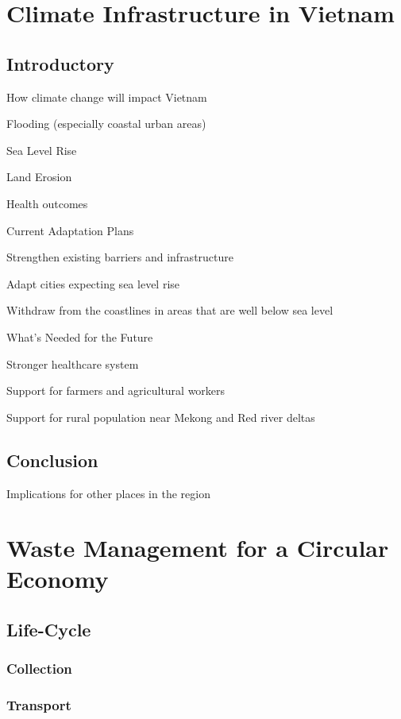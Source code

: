 \documentclass{book}\usepackage{knitr}
\begin{document}
\begin{knitrout}
\begin{kframe}
{\chapter{Climate Infrastructure in Vietnam}

\section{Introductory}

How climate change will impact Vietnam

Flooding (especially coastal urban areas)

Sea Level Rise

Land Erosion

Health outcomes

Current Adaptation Plans

Strengthen existing barriers and infrastructure

Adapt cities expecting sea level rise

Withdraw from the coastlines in areas that are well below sea level

What's Needed for the Future

Stronger healthcare system

Support for farmers and agricultural workers

Support for rural population near Mekong and Red river deltas

\section{Conclusion}

Implications for other places in the region


\chapter{Waste Management for a Circular Economy}

\section{Life-Cycle}

\subsection{Collection}

\subsection{Transport}

}
\end{kframe}
\end{knitrout}
\end{document}
